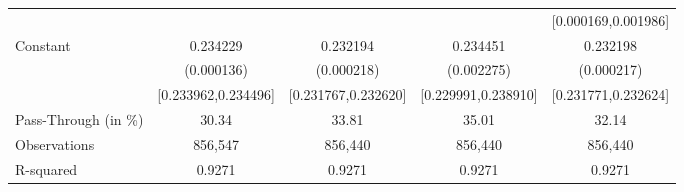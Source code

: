 {\begin{tabular}{l*{4}{c}}
                    &                     &                     &                     &[0.000169,0.001986]         \\
Constant            &    0.234229\sym{***}&    0.232194\sym{***}&    0.234451\sym{***}&    0.232198\sym{***}\\
                    &  (0.000136)         &  (0.000218)         &  (0.002275)         &  (0.000217)         \\
                    &[0.233962,0.234496]         &[0.231767,0.232620]         &[0.229991,0.238910]         &[0.231771,0.232624]         \\
\midrule
Pass-Through (in \%)&       30.34         &       33.81         &       35.01         &       32.14         \\
Observations        &     856,547         &     856,440         &     856,440         &     856,440         \\
R-squared           &      0.9271         &      0.9271         &      0.9271         &      0.9271         \\
\bottomrule
\end{tabular}
}
